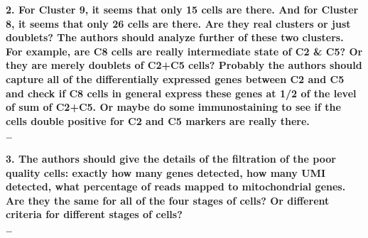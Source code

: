 \documentclass{article}
\begin{document}
\textbf{2. For Cluster 9, it seems that only 15 cells are there. And for Cluster 8, it seems that only 26 cells are there. Are they real clusters or just doublets? The authors should analyze further of these two clusters. For example, are C8 cells are really intermediate state of C2 \& C5? Or they are merely doublets of C2+C5 cells? Probably the authors should capture all of the differentially expressed genes between C2 and C5 and check if C8 cells in general express these genes at 1/2 of the level of sum of C2+C5. Or maybe do some immunostaining to see if the cells double positive for C2 and C5 markers are really there.}\\
\ldots

\textbf{3. The authors should give the details of the filtration of the poor quality cells: exactly how many genes detected, how many UMI detected, what percentage of reads mapped to mitochondrial genes. Are they the same for all of the four stages of cells? Or different criteria for different stages of cells?}\\
\ldots

\printbibliography
\end{document}
